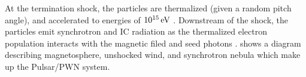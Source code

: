 At the termination shock, the particles are thermalized
(given a random pitch angle), and accelerated to energies of
$10^{15}\,\text{eV}$ \citep{arons_1996_pulsars-gamma-rays}.
Downstream of the shock, the particles emit synchrotron and \ac{IC}
radiation as the thermalized electron population interacts with the
magnetic filed and seed photons \citep{gaensler_2006_evolution-structure}.
 shows a diagram describing magnetosphere,
unshocked wind, and synchrotron nebula which make up the Pulsar/\ac{PWN}
system.


